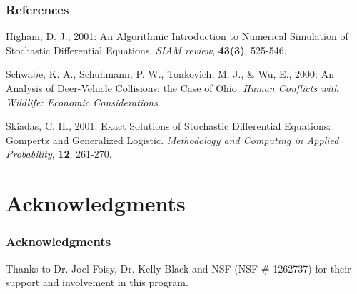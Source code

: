 \documentclass{beamer}   %
\begin{document}
\begin{frame}
    \frametitle{References}

\begin{thebibliography}{3}

Higham, D. J., 2001:
An Algorithmic Introduction to Numerical Simulation of Stochastic Differential Equations.
\emph{SIAM review},
\textbf{43(3)}, 525-546.

Schwabe, K. A., Schuhmann, P. W., Tonkovich, M. J., \& Wu, E., 2000:
An Analysis of Deer-Vehicle Collisions: the Case of Ohio.
\emph{Human Conflicts with Wildlife: Economic Considerations}.

Skiadas, C. H., 2001:
Exact Solutions of Stochastic Differential Equations: Gompertz and Generalized Logistic.
\emph{Methodology and Computing in Applied Probability},
\textbf{12}, 261-270.

\end{thebibliography}

\end{frame}



\section{Acknowledgments}

\begin{frame}
    \frametitle{Acknowledgments}
	Thanks to Dr. Joel Foisy, Dr. Kelly Black and NSF (NSF \# 1262737) for their support and involvement in this program.
\end{frame}
\end{document}
